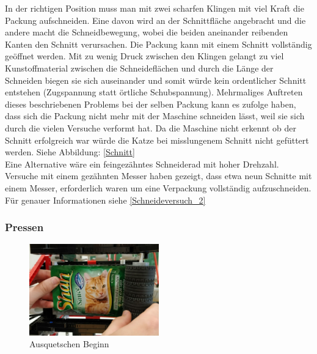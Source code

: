 In der richtigen Position muss man mit zwei scharfen Klingen mit viel Kraft die Packung aufschneiden. Eine davon wird an der Schnittfläche angebracht und die andere macht die Schneidbewegung, wobei die beiden aneinander reibenden Kanten den Schnitt verursachen. Die Packung kann mit einem Schnitt vollständig geöffnet werden. Mit zu wenig Druck zwischen den Klingen gelangt zu viel Kunstoffmaterial zwischen die Schneideflächen und durch die Länge der Schneiden biegen sie sich auseinander und somit würde  kein ordentlicher Schnitt entstehen (Zugspannung statt örtliche Schubspannung). Mehrmaliges Auftreten dieses beschriebenen Problems bei der selben Packung kann es zufolge haben, dass sich die Packung nicht mehr mit der Maschine schneiden lässt, weil sie sich durch die vielen Versuche verformt hat. Da die Maschine nicht erkennt ob der Schnitt erfolgreich war würde die Katze bei misslungenem Schnitt nicht gefüttert werden. Siehe Abbildung: \ref{Schnitt} \\

Eine Alternative wäre ein feingezähntes Schneiderad mit hoher Drehzahl. Versuche mit einem gezähnten Messer haben gezeigt, dass etwa neun Schnitte mit einem Messer, erforderlich waren um eine Verpackung vollständig aufzuschneiden. Für genauer Informationen siehe \ref{Schneideversuch_2}


\subsubsection{Pressen}

\begin{figure}
\vspace{-30pt}
  \begin{center}
    \includegraphics[width=0.50\textwidth]{Bilder/Ablauf_1_png/Ausquetschen_1}
  \end{center}
  \caption{Ausquetschen Beginn}
  \label{Ausquetschen Beginn}
  \vspace{-10pt}
\end{figure}

